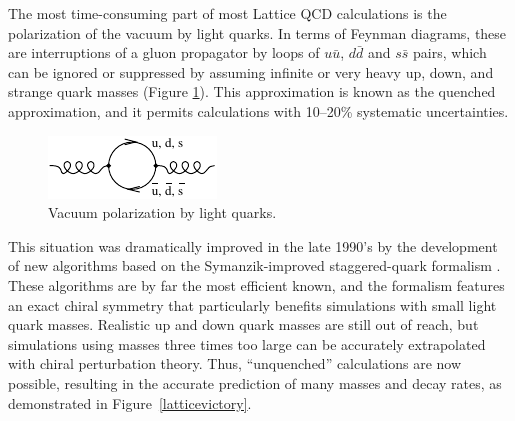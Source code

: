 \documentclass{cornell}
\begin{document}
The most time-consuming part of most Lattice QCD calculations is the
polarization of the vacuum by light quarks.  In terms of Feynman
diagrams, these are interruptions of a gluon propagator by loops of
$u\bar{u}$, $d\bar{d}$ and $s\bar{s}$ pairs, which can be ignored or
suppressed by assuming infinite or very heavy up, down, and strange
quark masses (Figure \ref{vacuumpolarization}).  This approximation is
known as the quenched approximation, and it permits calculations with
10--20\% systematic uncertainties.

\begin{figure}[t]
  \begin{center}
    \includegraphics[width=0.35\linewidth]{newplots/vacuumpolarization}
  \end{center}
  \caption[Vacuum polarization by light
  quarks]{\label{vacuumpolarization} Vacuum polarization by light
  quarks.}
\end{figure}

This situation was dramatically improved in the late 1990's by the
development of new algorithms based on the Symanzik-improved
staggered-quark formalism \cite{confronts}.  These algorithms are by
far the most efficient known, and the formalism features an exact
chiral symmetry that particularly benefits simulations with small
light quark masses.  Realistic up and down quark masses are still out
of reach, but simulations using masses three times too large can be
accurately extrapolated with chiral perturbation theory.  Thus,
``unquenched'' calculations are now possible, resulting in the
accurate prediction of many masses and decay rates, as demonstrated in
Figure~\ref{latticevictory}.
\end{document}
